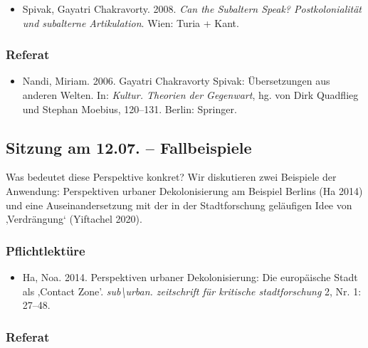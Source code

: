 \documentclass[
]{article}
\providecommand{\tightlist}{%
  \setlength{\itemsep}{0pt}\setlength{\parskip}{0pt}}
\begin{document}
\begin{itemize}
\tightlist
\item
  Spivak, Gayatri Chakravorty. 2008. \emph{Can the Subaltern Speak? Postkolonialität und subalterne Artikulation}. Wien: Turia + Kant.
\end{itemize}

\hypertarget{referat-10}{%
\subsubsection*{Referat}\label{referat-10}}

\begin{itemize}
\tightlist
\item
  Nandi, Miriam. 2006. Gayatri Chakravorty Spivak: Übersetzungen aus anderen Welten. In: \emph{Kultur. Theorien der Gegenwart}, hg. von Dirk Quadflieg und Stephan Moebius, 120--131. Berlin: Springer.
\end{itemize}

\hypertarget{sitzung-am-12.07.-fallbeispiele}{%
\subsection{Sitzung am 12.07. -- Fallbeispiele}\label{sitzung-am-12.07.-fallbeispiele}}

Was bedeutet diese Perspektive konkret? Wir diskutieren zwei Beispiele der Anwendung: Perspektiven urbaner Dekolonisierung am Beispiel Berlins (Ha 2014) und eine Auseinandersetzung mit der in der Stadtforschung geläufigen Idee von ‚Verdrängung` (Yiftachel 2020).

\hypertarget{pflichtlektuxfcre-11}{%
\subsubsection*{Pflichtlektüre}\label{pflichtlektuxfcre-11}}

\begin{itemize}
\tightlist
\item
  Ha, Noa. 2014. Perspektiven urbaner Dekolonisierung: Die europäische Stadt als ‚Contact Zone'. \emph{sub\textbackslash urban. zeitschrift für kritische stadtforschung} 2, Nr. 1: 27--48.
\end{itemize}

\hypertarget{referat-11}{%
\subsubsection*{Referat}\label{referat-11}}
\end{document}
